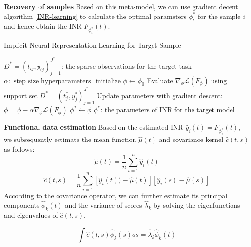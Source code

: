 \documentclass{article}
\begin{document}
\textbf{Recovery of samples}
Based on this meta-model, we can use gradient decent algorithm \ref{INR-learning} to calculate the optimal parameters $\phi^*_i$ for the sample $i$ and hence obtain the INR $F_{\phi^*_i}(t)$. 
\begin{algorithm}[htb]
	\renewcommand{\algorithmicrequire}{\textbf{Input:}}
	\renewcommand{\algorithmicensure}{\textbf{Output:}}
	\caption{Implicit Neural Representation Learning for Target Sample}
	\label{INR-learning}
	\begin{algorithmic}
    \REQUIRE $D^*=(t_{ij},y_{ij})_{j=1}^{J^*}$: the sparse observations for the target task
    \REQUIRE $\alpha: \text { step size hyperparameters }$
		\STATE initialize $\phi \gets \phi_0$
      \STATE Evaluate $\nabla_{\phi} \mathcal{L}\left(F_{\phi}\right)$ using support set $D^*=(t_{j}^*,y_{j}^*)_{j=1}^{J^*}$
      \STATE Update parameters with gradient descent:
      $\phi=\phi-\alpha \nabla_{\phi} \mathcal{L}\left(F_{\phi}\right)$
    \ENDWHILE 
    \STATE $\phi^* \gets \phi$
		\ENSURE $\phi^*$: the parameters of INR for the target model 
  \end{algorithmic}  
\end{algorithm}

\textbf{Functional data estimation}
Based on the estimated INR $\hat{y}_i(t)=F_{\phi^*_i}(t)$, we subsequently estimate the mean function $\hat{\mu}(t)$ and covariance kernel $\hat{c}(t,s)$ as follows:
$$
\hat{\mu}(t)= \frac{1}{n} \sum_{i=1}^n \hat{y}_i(t)
$$
$$
\hat{c}(t,s)= \frac{1}{n} \sum_{i=1}^n  [\hat{y}_i(t))-\hat{\mu}(t)] [\hat{y}_i(s)-\hat{\mu}(s) ]
$$
According to the covariance operator, we can further estimate its principal components $\hat{\phi}_k(t)$ and the variance of scores $\hat \lambda_k$ by solving the eigenfunctions and eigenvalues of $\hat{c}(t,s)$.

$$
\int \hat{c}(t,s) \hat{\phi}_k(s) ds= \hat \lambda_k \hat{\phi}_k(t)
$$
\end{document}
